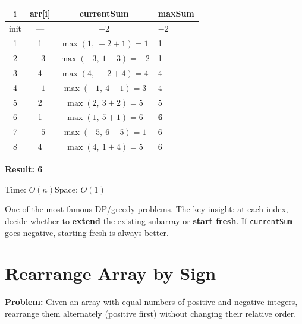 \documentclass[12pt,a4paper,oneside]{book}
\begin{document}
\begin{dryrun}[Dry Run: arr = \{$-2$, 1, $-3$, 4, $-1$, 2, 1, $-5$, 4\}]
\begin{center}
\begin{tabular}{cccl}
\toprule
\textbf{i} & \textbf{arr[i]} & \textbf{currentSum} & \textbf{maxSum}\\
\midrule
init& ---& $-2$ & $-2$\\
1 & 1    & $\max(1,\ -2+1)=1$     & 1\\
2 & $-3$ & $\max(-3,\ 1-3)=-2$    & 1\\
3 & 4    & $\max(4,\ -2+4)=4$     & 4\\
4 & $-1$ & $\max(-1,\ 4-1)=3$     & 4\\
5 & 2    & $\max(2,\ 3+2)=5$      & 5\\
6 & 1    & $\max(1,\ 5+1)=6$      & \textbf{6}\\
7 & $-5$ & $\max(-5,\ 6-5)=1$     & 6\\
8 & 4    & $\max(4,\ 1+4)=5$      & 6\\
\bottomrule
\end{tabular}
\end{center}
\textbf{Result: 6}
\end{dryrun}

\begin{complexity}
Time: $O(n)$\quad Space: $O(1)$
\end{complexity}

\begin{interviewcorner}
One of the most famous DP/greedy problems. The key insight: at each index, decide whether to \textbf{extend} the existing subarray or \textbf{start fresh}. If \texttt{currentSum} goes negative, starting fresh is always better.
\end{interviewcorner}

\section{Rearrange Array by Sign}

\textbf{Problem:} Given an array with equal numbers of positive and negative integers, rearrange them alternately (positive first) without changing their relative order.
\end{document}
